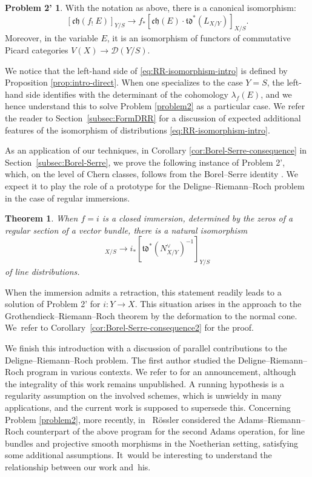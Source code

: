 \documentclass[11pt]{article}
\theoremstyle{plain}
\newtheorem{thm}{Theorem}
\theoremstyle{definition}
\newtheorem*{problem2prime}{Problem 2'}
\newcommand{\Dcal}{\mathcal D}
\newcommand{\Ocal}{\mathcal O}
\newcommand{\chfrak}{\mathfrak {ch}}
\newcommand{\tdfrak}{\mathfrak {td}}
\begin{document}
\begin{problem2prime}

With the notation as above, there is a canonical isomorphism:
\begin{equation}\label{eq:RR-isomorphism-intro}
[\chfrak(f_!\ E)]_{Y/S}\to f_\ast [\chfrak(E) \cdot \tdfrak^{\ast}(L_{X/Y})]_{X/S}.
\end{equation}
Moreover, in the variable $E$, it is an isomorphism of functors of commutative Picard categories $V(X)\to\Dcal(Y/S)$.
\end{problem2prime}

We notice that the left-hand side of \eqref{eq:RR-isomorphism-intro} is defined by Proposition \ref{prop:intro-direct}. When one specializes to the case $Y=S$, the left-hand side identifies with the determinant of the cohomology $\lambda_{f}(E)$, and we hence understand this to solve Problem \ref{problem2} as a particular case. We refer the reader to Section~\ref{subsec:FormDRR} for a discussion of expected additional features of the isomorphism of distributions \eqref{eq:RR-isomorphism-intro}.

As an application of our techniques, in Corollary \ref{cor:Borel-Serre-consequence} in Section~\ref{subsec:Borel-Serre}, we prove the following instance of Problem 2', which, on the level of Chern classes, follows from the Borel--Serre identity \cite[Lem.\,18]{Borel-Serre}. We expect it to play the role of a prototype for the Deligne--Riemann--Roch problem in the case of regular immersions.

\begin{thm}
When $f=i$ is a closed immersion, determined by the zeros of a regular section of a vector bundle, there is a natural isomorphism
\begin{displaymath}
[\chfrak(i_! \ \Ocal_Y)]_{X/S} \to i_\ast [\tdfrak^{\ast}(N_{X/Y}^\vee)^{-1}]_{Y/S}
\end{displaymath}
of line distributions.
\end{thm}
When the immersion admits a retraction, this statement readily leads to a solution of Problem 2' for $i\colon Y\to X$. This situation arises in the approach to the Grothendieck--Riemann--Roch theorem by the deformation to the normal cone. We~refer to Corollary~\ref{cor:Borel-Serre-consequence2} for the proof.

We finish this introduction with a discussion of parallel contributions to the Deligne--Riemann--Roch problem.
The first author studied the Deligne--Riemann--Roch program in various contexts. We refer to \cite{EriComptes} for an announcement, although the integrality of this work remains unpublished. A running hypothesis is a regularity assumption on the involved schemes, which is unwieldy in many applications, and the current work is supposed to supersede this. Concerning Problem \ref{problem2}, more recently, in~\cite{Rossler-ARR} Rössler considered the Adams--Riemann--Roch counterpart of the above program for the second Adams operation, for line bundles and projective smooth morphisms in the Noetherian setting, satisfying some additional assumptions. It~would be interesting to understand the relationship between our work and~his.
\end{document}
